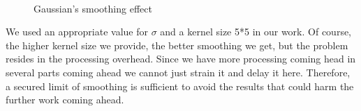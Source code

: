 \documentclass[12pt,fleqn]{book} %
\begin{document}
\begin{figure}[h]
\begin{dBox}
\centering
  \mbox{
   }
   \caption{Gaussian’s smoothing effect \label{fig:fig6} }   
\end{dBox}   
\end{figure}


We used an appropriate value for $\sigma$ and a kernel size 5*5 in our work. Of course, the higher 
kernel size we provide, the better smoothing we get, but the problem resides in the processing 
overhead. Since we have more processing coming head in several parts coming ahead we cannot 
just strain it and delay it here. Therefore, a secured limit of smoothing is sufficient to avoid the 
results that could harm the further work coming ahead. 
\bigskip
\end{document}
